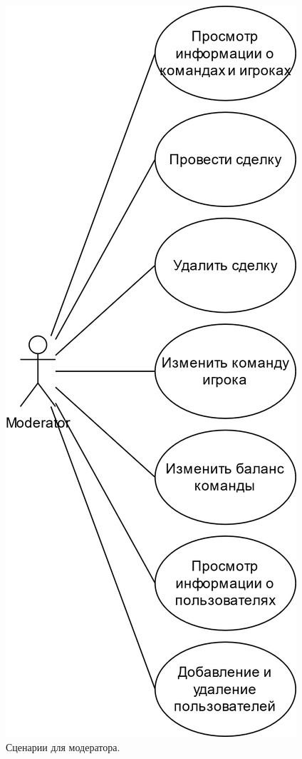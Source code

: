\begin{figure}[h!]
	\centering
	\includegraphics[scale=0.25]{img/UseCaseModerator.png}
	\caption{Сценарии для модератора.}
	\label{img:UseCaseModerator}
\end{figure}
\newpage

